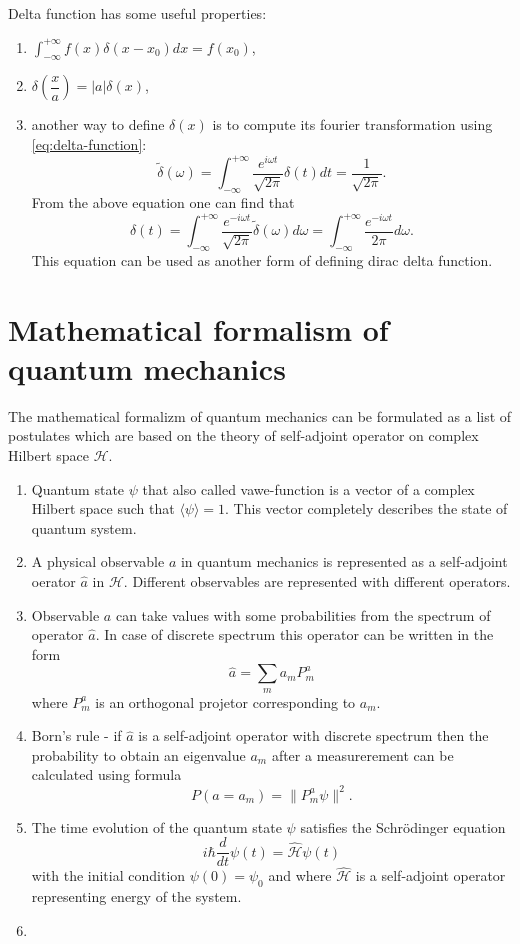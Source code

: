 \documentclass[11pt]{article}
\begin{document}
Delta function has some useful properties:
\begin{enumerate}
\item $\int _{-\infty}^{+\infty} f(x)\delta(x - x_0)dx = f(x_0)$,
\item $\delta\left(\dfrac{x}{a}\right) = |a|\delta(x)$,
\item another way to define $\delta(x)$ is to compute its fourier transformation using \eqref{eq:delta-function}:
\[
\tilde{\delta}(\omega) = \int_{-\infty}^{+\infty}\dfrac{e^{i\omega t}}{\sqrt{2\pi}}\delta(t)dt = \dfrac{1}{\sqrt{2\pi}}.
\]
From the above equation one can find that 
\[
\delta(t) = \int_{-\infty}^{+\infty}\dfrac{e^{-i\omega t}}{\sqrt{2\pi}}\tilde{\delta}(\omega)d\omega = \int_{-\infty}^{+\infty}\dfrac{e^{-i\omega t}}{2\pi}d\omega.
\]
This equation can be used as another form of defining dirac delta function.
\end{enumerate}


\section{Mathematical formalism of quantum mechanics}
The mathematical formalizm of quantum mechanics can be formulated as a list of postulates which are based on the theory of self-adjoint operator on complex Hilbert space $\mathcal{H}$. 
\begin{enumerate}[label=\bfseries Postulate \arabic*:, align=left]
  \item Quantum state $\psi$ that also called vawe-function is a vector of a complex Hilbert space such that $\langle\psi\rangle = 1$. This vector completely describes the state of quantum system.
  \item A physical observable $a$ in quantum mechanics is represented as a self-adjoint oerator $\hat{a}$ in $\mathcal{H}$. Different observables are represented with different operators.
  \item Observable $a$ can take values with some probabilities from the spectrum of operator $\hat{a}$. In case of discrete spectrum this operator can be written in the form 
  \[
  \hat{a} = \sum_m a_mP_m^a
  \]
    where $P_m^a$ is an orthogonal projetor corresponding to $a_m$.
  \item Born's rule - if $\hat{a}$ is a self-adjoint operator with discrete spectrum then the probability to obtain an eigenvalue $a_m$ after a measurerement can be calculated using formula
  \[
  P(a = a_m) = \| P_m^a\psi\|^2.
  \]
  \item The time evolution of the quantum state $\psi$ satisfies the Schr\"{o}dinger equation
  \[
  i\hbar \dfrac{d}{dt}\psi(t) = \mathcal{\hat{H}}\psi(t)
  \] 
  with the initial condition $\psi(0) = \psi_0$ and
  where $\mathcal{\hat{H}}$ is a self-adjoint operator representing energy of the system.
  \item 
\end{enumerate}
\end{document}
